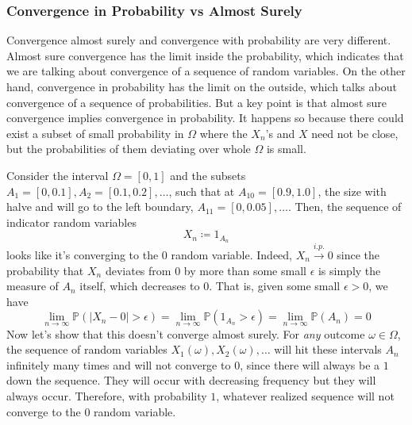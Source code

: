 \documentclass{article}
\begin{document}
    \subsubsection{Convergence in Probability vs Almost Surely} 

      Convergence almost surely and convergence with probability are very different. Almost sure convergence has the limit inside the probability, which indicates that we are talking about convergence of a sequence of random variables. On the other hand, convergence in probability has the limit on the outside, which talks about convergence of a sequence of probabilities. But a key point is that almost sure convergence implies convergence in probability. It happens so because there could exist a subset of small probability in $\Omega$ where the $X_n$'s and $X$ need not be close, but the probabilities of them deviating over whole $\Omega$ is small. 

      \begin{example}
        Consider the interval $\Omega = [0, 1]$ and the subsets $A_1 = [0, 0.1], A_2 = [0.1, 0.2], \ldots$, such that at $A_{10} = [0.9, 1.0]$, the size with halve and will go to the left boundary, $A_{11} = [0, 0.05], \ldots$. Then, the sequence of indicator random variables 
        \begin{equation}
          X_n \coloneqq 1_{A_n}
        \end{equation}
        looks like it's converging to the $0$ random variable. Indeed, $X_n \xrightarrow{i.p.} 0$ since the probability that $X_n$ deviates from $0$ by more than some small $\epsilon$ is simply the measure of $A_n$ itself, which decreases to $0$. That is, given some small $\epsilon > 0$, we have 
        \begin{equation}
          \lim_{n \rightarrow \infty} \mathbb{P} (|X_n - 0| > \epsilon) = \lim_{n \rightarrow \infty} \mathbb{P}(1_{A_n} > \epsilon ) = \lim_{n \rightarrow \infty} \mathbb{P}(A_n) = 0
        \end{equation}
        Now let's show that this doesn't converge almost surely. For \textit{any} outcome $\omega \in \Omega$, the sequence of random variables $X_1(\omega), X_2(\omega), \ldots$ will hit these intervals $A_n$ infinitely many times and will not converge to $0$, since there will always be a $1$ down the sequence. They will occur with decreasing frequency but they will always occur. Therefore, with probability $1$, whatever realized sequence will not converge to the $0$ random variable. 
      \end{example}
\end{document}
